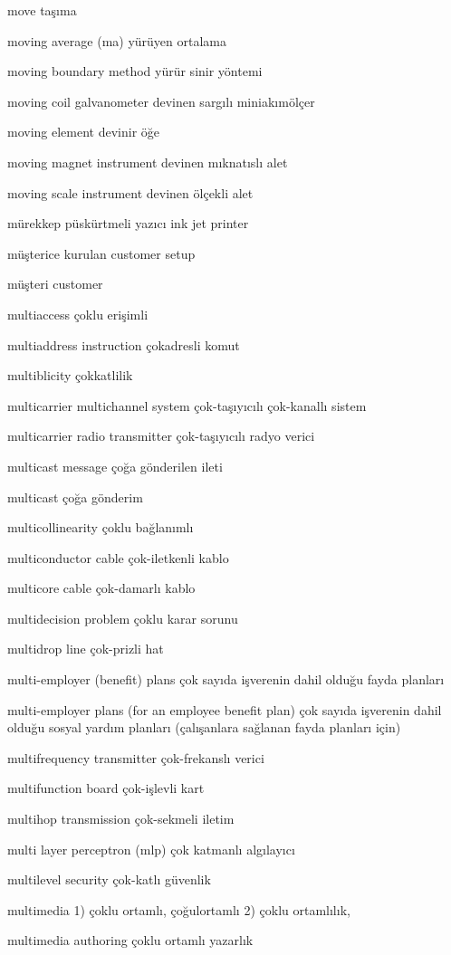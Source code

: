 \documentclass[12pt,fleqn]{article}\usepackage{../../common}
\begin{document}
move taşıma

moving average (ma) yürüyen ortalama

moving boundary method yürür sinir yöntemi

moving coil galvanometer devinen sargılı miniakımölçer

moving element devinir öğe

moving magnet instrument devinen mıknatıslı alet

moving scale instrument devinen ölçekli alet

mürekkep püskürtmeli yazıcı ink jet printer

müşterice kurulan customer setup

müşteri customer

multiaccess çoklu erişimli

multiaddress instruction çokadresli komut

multiblicity çokkatlilik

multicarrier multichannel system çok-taşıyıcılı çok-kanallı sistem

multicarrier radio transmitter çok-taşıyıcılı radyo verici

multicast message çoğa gönderilen ileti

multicast çoğa gönderim

multicollinearity çoklu bağlanımlı

multiconductor cable çok-iletkenli kablo

multicore cable çok-damarlı kablo

multidecision problem çoklu karar sorunu

multidrop line çok-prizli hat

multi-employer (benefit) plans çok sayıda işverenin dahil olduğu fayda planları

multi-employer plans (for an employee benefit plan) çok sayıda işverenin dahil olduğu sosyal yardım planları (çalışanlara sağlanan fayda planları için)

multifrequency transmitter çok-frekanslı verici

multifunction board çok-işlevli kart

multihop transmission çok-sekmeli iletim

multi layer perceptron (mlp) çok katmanlı algılayıcı

multilevel security çok-katlı güvenlik

multimedia 1) çoklu ortamlı, çoğulortamlı 2) çoklu ortamlılık,

multimedia authoring çoklu ortamlı yazarlık
\end{document}
